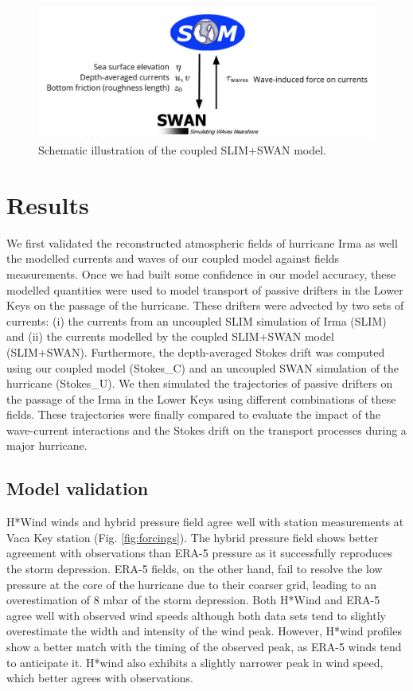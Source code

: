 \documentclass[11pt,a4paper]{article}
\begin{document}
\begin{figure}
    \centering
    \includegraphics[width=.95\textwidth]{fig/coupling.png}
    \caption{Schematic illustration of the coupled SLIM+SWAN model.}
    \label{fig:coupling}
\end{figure}
 

\section{Results}

We first validated the reconstructed atmospheric fields of hurricane Irma as well the modelled currents and waves of our coupled model against fields measurements. Once we had built some confidence in our model accuracy, these modelled quantities were used to model transport of passive drifters in the Lower Keys on the passage of the hurricane. These drifters were advected by two sets of currents: (i) the currents from an uncoupled SLIM simulation of Irma (SLIM) and (ii) the currents modelled by the coupled SLIM+SWAN model (SLIM+SWAN). Furthermore, the depth-averaged Stokes drift was computed using our coupled model (Stokes\_C) and an uncoupled SWAN simulation of the hurricane (Stokes\_U). We then simulated the trajectories of passive drifters on the passage of the Irma in the Lower Keys using different combinations of these fields. These trajectories were finally compared to evaluate the impact of the wave-current interactions and the Stokes drift on the transport processes during a major hurricane.

\subsection{Model validation}

H*Wind winds and hybrid pressure field agree well with station measurements at Vaca Key station (Fig. \ref{fig:forcings}). The hybrid pressure field shows better agreement with observations than ERA-5 pressure as it successfully reproduces the storm depression. ERA-5 fields, on the other hand, fail to resolve the low pressure at the core of the hurricane due to their coarser grid, leading to an overestimation of 8 mbar of the storm depression. Both H*Wind and ERA-5 agree well with observed wind speeds although both data sets tend to slightly overestimate the width and intensity of the wind peak. However, H*wind profiles show a better match with the timing of the observed peak, as ERA-5 winds tend to anticipate it. H*wind also exhibits a slightly narrower peak in wind speed, which better agrees with observations.
\end{document}
